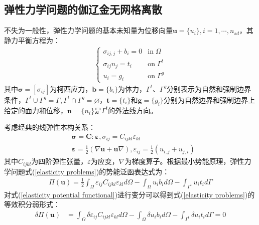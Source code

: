 \subsection{弹性力学问题的伽辽金无网格离散}
不失为一般性，弹性力学问题的基本未知量为位移向量$\pmb{u}=\{u_i\},i=1,\dotsb,n_{sd}$，其静力平衡方程为：
\begin{equation}\label{elasticity problems}
\begin{split}
\begin{cases}
    \sigma_{ij,j}+b_i=0&\text{in}\;\Omega\\
    \sigma_{ij}n_j=t_i&\text{on}\;\Gamma^t\\
    u_i=g_i&\text{on}\;\Gamma^g
\end{cases}
\end{split}
\end{equation}
其中$\pmb \sigma=[\sigma_{ij}]$为柯西应力，$\pmb{b}=\{b_i\}$为体力，$\Gamma^t \text{、}\Gamma^g$分别表示为自然和强制边界条件，$\Gamma^t\cup \Gamma^g=\Gamma,\Gamma^t\cap \Gamma^g=\varnothing$，$\pmb{t}=\{t_i\}$和$\pmb{g}=\{g_i\}$分别为自然边界和强制边界上给定的面力和位移，$\pmb{n}=\{n_i\}$是$\Gamma^{t}$的外法线方向。\par
考虑经典的线弹性本构关系：
\begin{equation}\label{constitutive relation}
\begin{split}
        &\pmb{\sigma}=\pmb{C}\pmb{:}\pmb{\varepsilon},\sigma_{ij}=C_{ijkl}\varepsilon_{kl}\\
        &\pmb{\varepsilon}=\frac{1}{2}(\nabla \pmb{u}+\pmb{u}\nabla),\varepsilon_{ij}=\frac{1}{2}(u_{i,j}+u_{j,i})
\end{split}
\end{equation}
其中$C_{ijkl}$为四阶弹性张量，$\varepsilon$为应变，$\nabla$为梯度算子。根据最小势能原理，弹性力学问题式(\ref{elasticity problems})的势能泛函表达式为：
\begin{equation}\label{elasticity potential functional}
\begin{split}
    \Pi(\pmb{u})=\frac{1}{2}\int_{\Omega}\varepsilon_{ij}C_{ijkl}\varepsilon_{kl}d\Omega-\int_{\Omega}u_ib_id\Omega-\int_{\Gamma^t}u_it_id\Gamma
\end{split}
\end{equation}
对式(\ref{elasticity potential functional})进行变分可以得到式(\ref{elasticity problems})的等效积分弱形式：
\begin{equation}\label{elasticity weak form}
\begin{split}
    \delta\Pi(\pmb{u})&=\int_{\Omega}\delta\varepsilon_{ij}C_{ijkl}\varepsilon_{kl}d\Omega-\int_{\Omega}\delta u_ib_id\Omega-\int_{\Gamma^t}\delta u_it_id\Gamma=0
\end{split}
\end{equation}\par
